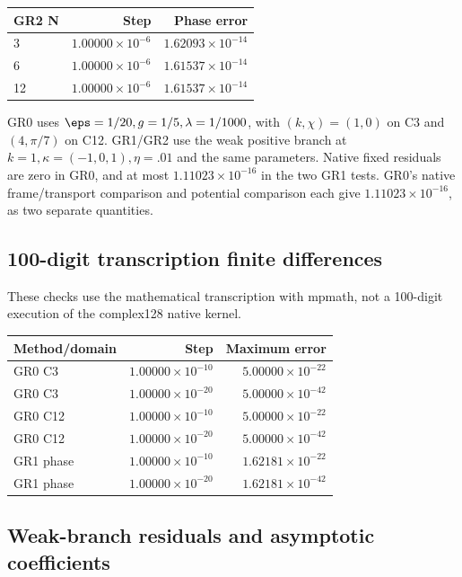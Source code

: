 \begin{center}\begin{tabular}{@{}lrr@{}}
\toprule
GR2 N & Step & Phase error\\\midrule
3 & \(1.00000\times10^{-6}\) & \(1.62093\times10^{-14}\)\\
6 & \(1.00000\times10^{-6}\) & \(1.61537\times10^{-14}\)\\
12 & \(1.00000\times10^{-6}\) & \(1.61537\times10^{-14}\)\\
\bottomrule\end{tabular}\end{center}

GR0 uses \(\eps=1/20,g=1/5,\lambda=1/1000\), with
\((k,\chi)=(1,0)\) on C3 and \((4,\pi/7)\) on C12. GR1/GR2 use the
weak positive branch at \(k=1,\kappa=(-1,0,1),\eta=.01\) and the same
parameters. Native fixed residuals are zero in GR0, and at most
\(1.11023\times10^{-16}\) in the two GR1 tests.
GR0's native frame/transport comparison and potential comparison each give
\(1.11023\times10^{-16}\), as two separate quantities.

\subsection*{100-digit transcription finite differences}
These checks use the mathematical transcription with mpmath, not a
100-digit execution of the complex128 native kernel.

\begin{center}\begin{tabular}{@{}lrr@{}}
\toprule
Method/domain & Step & Maximum error\\\midrule
GR0 C3 & \(1.00000\times10^{-10}\) & \(5.00000\times10^{-22}\)\\
GR0 C3 & \(1.00000\times10^{-20}\) & \(5.00000\times10^{-42}\)\\
GR0 C12 & \(1.00000\times10^{-10}\) & \(5.00000\times10^{-22}\)\\
GR0 C12 & \(1.00000\times10^{-20}\) & \(5.00000\times10^{-42}\)\\
GR1 phase & \(1.00000\times10^{-10}\) & \(1.62181\times10^{-22}\)\\
GR1 phase & \(1.00000\times10^{-20}\) & \(1.62181\times10^{-42}\)\\
\bottomrule\end{tabular}\end{center}

\subsection*{Weak-branch residuals and asymptotic coefficients}

